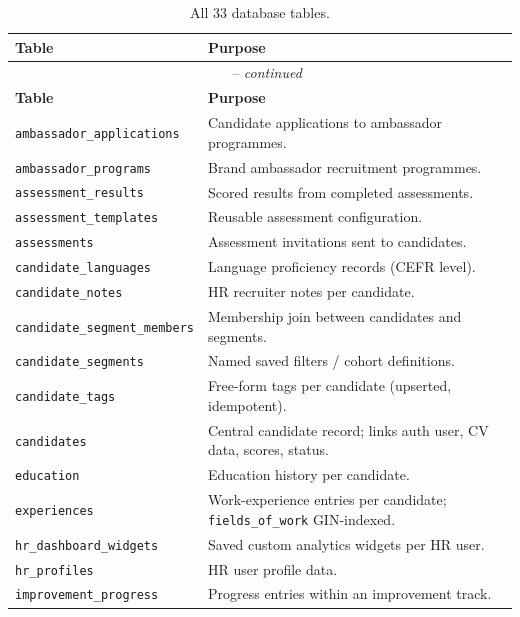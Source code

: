 \begin{longtable}{@{}l p{9cm}@{}}
	\caption{All 33 database tables.}
	\label{tab:db-all-tables} \\
	\toprule
	\textbf{Table} & \textbf{Purpose} \\
	\midrule
	\endfirsthead
	\multicolumn{2}{c}{\tablename\ \thetable\ -- \textit{continued}} \\
	\toprule
	\textbf{Table} & \textbf{Purpose} \\
	\midrule
	\endhead
	\bottomrule
	\endlastfoot

	\texttt{ambassador\_applications}    & Candidate applications to ambassador programmes. \\
	\texttt{ambassador\_programs}        & Brand ambassador recruitment programmes. \\
	\texttt{assessment\_results}         & Scored results from completed assessments. \\
	\texttt{assessment\_templates}       & Reusable assessment configuration. \\
	\texttt{assessments}                 & Assessment invitations sent to candidates. \\
	\texttt{candidate\_languages}        & Language proficiency records (CEFR level). \\
	\texttt{candidate\_notes}            & HR recruiter notes per candidate. \\
	\texttt{candidate\_segment\_members} & Membership join between candidates and segments. \\
	\texttt{candidate\_segments}         & Named saved filters / cohort definitions. \\
	\texttt{candidate\_tags}             & Free-form tags per candidate (upserted, idempotent). \\
	\texttt{candidates}                  & Central candidate record; links auth user, CV data, scores, status. \\
	\texttt{education}                   & Education history per candidate. \\
	\texttt{experiences}                 & Work-experience entries per candidate; \texttt{fields\_of\_work} GIN-indexed. \\
	\texttt{hr\_dashboard\_widgets}      & Saved custom analytics widgets per HR user. \\
	\texttt{hr\_profiles}                & HR user profile data. \\
	\texttt{improvement\_progress}       & Progress entries within an improvement track. \\

\end{longtable}

